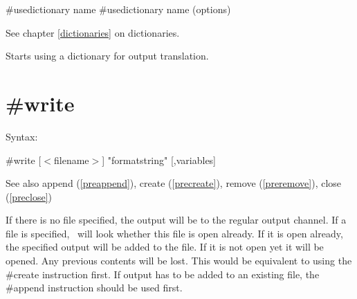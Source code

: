 \#usedictionary name
\#usedictionary name (options)
 
\noindent See chapter \ref{dictionaries} on dictionaries.

\noindent Starts using a dictionary for output translation.


\section{\#write}
\label{prewrite}

\noindent Syntax:

\#write [$<$filename$>$] "formatstring" [,variables]
 
\noindent See also append (\ref{preappend}),
            create (\ref{precreate}), remove (\ref{preremove}),
            close (\ref{preclose})

\noindent If there is no file specified, the output will be 
to the regular output channel. If a file is 
specified, \FORM\ will look whether this file is open already. If it is open 
already, the specified output will be added to the file. If it is not open 
yet it will be opened. Any previous contents will be lost. This would be 
equivalent to using the \#create instruction first. If 
output has to be added to an existing file, the \#append 
instruction should be used first.


